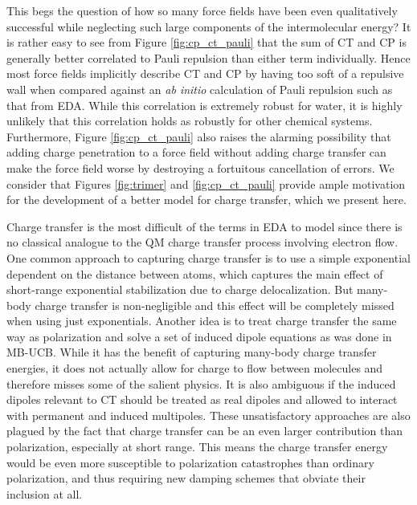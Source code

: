 \documentclass[journal=jctcce,manuscript=article]{achemso}
\begin{document}
This begs the question of how so many force fields have been even qualitatively successful while neglecting such large components of the intermolecular energy? It is rather easy to see from Figure \ref{fig:cp_ct_pauli} that the sum of CT and CP is generally better correlated to Pauli repulsion than either term individually. Hence most force fields implicitly describe CT and CP by having too soft of a repulsive wall when compared against an \textit{ab initio} calculation of Pauli repulsion such as that from EDA. While this correlation is extremely robust for water, it is highly unlikely that this correlation holds as robustly for other chemical systems. Furthermore, Figure \ref{fig:cp_ct_pauli} also raises the alarming possibility that adding charge penetration to a force field without adding charge transfer can make the force field worse by destroying a fortuitous cancellation of errors. We consider that Figures \ref{fig:trimer} and \ref{fig:cp_ct_pauli} provide ample motivation for the development of a better model for charge transfer, which we present here.

Charge transfer is the most difficult of the terms in EDA to model since there is no classical analogue to the QM charge transfer process involving electron flow.\cite{herman2023accurate} One common approach to
capturing charge transfer is to use a simple exponential dependent on the distance
between atoms\cite{rackers2021polarizable}, which captures the main effect of short-range exponential stabilization due to charge delocalization. But many-body charge transfer is non-negligible and this effect will be completely
missed when using just exponentials. Another idea is to treat charge transfer the same way as polarization and solve a set of induced dipole equations as was done in MB-UCB.\cite{das2019development,wang2023general}
While it has the benefit of capturing many-body charge transfer energies, it does not actually allow for charge to flow between molecules
and therefore misses some of the salient physics. It is also ambiguous if the induced
dipoles relevant to CT should be treated as real dipoles and allowed to interact 
with permanent and induced multipoles. These unsatisfactory approaches are also plagued by the fact that charge transfer can be an even larger contribution than polarization, especially at short range. This means the charge transfer energy would be even more susceptible to
polarization catastrophes than ordinary polarization, and thus requiring new damping schemes that obviate their inclusion at all. 
\end{document}
